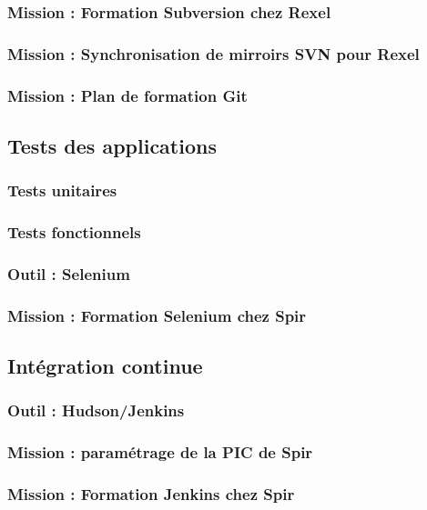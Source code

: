 \subsubsection{Mission : Formation Subversion chez Rexel}

\subsubsection{Mission : Synchronisation de mirroirs SVN pour Rexel}

\subsubsection{Mission : Plan de formation Git}



\subsection{Tests des applications}

\subsubsection{Tests unitaires}

\subsubsection{Tests fonctionnels}

\subsubsection{Outil : Selenium}

\subsubsection{Mission : Formation Selenium chez Spir}



\subsection{Intégration continue}

\subsubsection{Outil : Hudson/Jenkins}

\subsubsection{Mission : paramétrage de la PIC de Spir}

\subsubsection{Mission : Formation Jenkins chez Spir}

